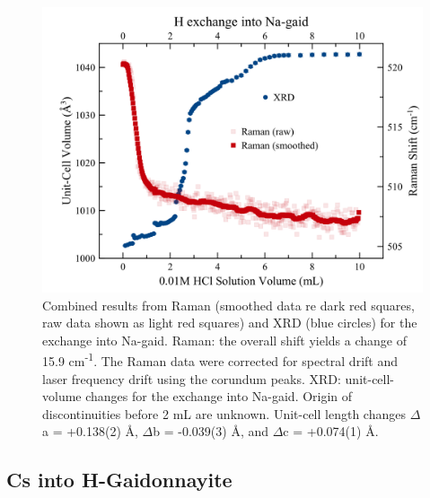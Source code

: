 \documentclass[journal=acsodf,manuscript=article]{achemso}
\begin{document}
\begin{figure}[h!]   %
\begin{center}
\includegraphics[width=0.70\columnwidth]{figures/XRD-Raman_H_into_Na-gaid.png} 
\caption{{Combined results from Raman (smoothed data re dark red squares, raw data shown as light red squares) and XRD (blue circles) for the
 exchange into Na-gaid. Raman: the overall shift
yields a change of 15.9  cm\textsuperscript{-1}.  The Raman data were
corrected for spectral drift and laser frequency drift using the
corundum peaks.  XRD: unit-cell-volume changes for the
 exchange into Na-gaid.  Origin of discontinuities
before 2 mL are unknown.  Unit-cell length changes \(\Delta\)a =
+0.138(2)  \AA, \(\Delta\)b = -0.039(3)  \AA, and
\(\Delta\)c = +0.074(1)  \AA.
{\label{fig_h_na_gaid}}%
}}
\end{center}
\end{figure} 

\subsection{Cs into H-Gaidonnayite}
{\label{sec_cs_h}}   %
\end{document}
